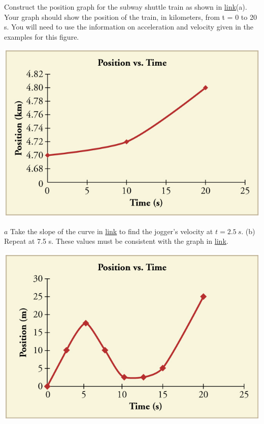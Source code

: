 \documentclass[
]{book}
\newenvironment{problems-exercises}{}{}
\begin{document}
\begin{problems-exercises}
\hypertarget{fs-id1372323}{}
\leavevmode\hypertarget{fs-id1544965}{}%
Construct the position graph for the subway shuttle train as shown in
\href{/m54772\#import-auto-id2590556}{link}(a). Your
graph should show the position of the train, in kilometers, from t = 0
to 20 s. You will need to use the information on acceleration and
velocity given in the examples for this figure.

\leavevmode\hypertarget{fs-id1778988}{}%
\includegraphics{images/Figure_02_08Sol_15.jpg}

\hypertarget{fs-id2290187}{}
\leavevmode\hypertarget{fs-id2290189}{}%
\(a\) Take the slope of the curve in
\protect\hyperlink{import-auto-id4064858}{link} to find the
jogger's velocity at \({{t = 2}\text{.}5\ s}{}\). (b) Repeat at 7.5 s.
These values must be consistent with the graph in
\protect\hyperlink{import-auto-id4128350}{link}.

\includegraphics{images/Figure_02_08Sol_16.jpg}


\end{problems-exercises}
\end{document}
